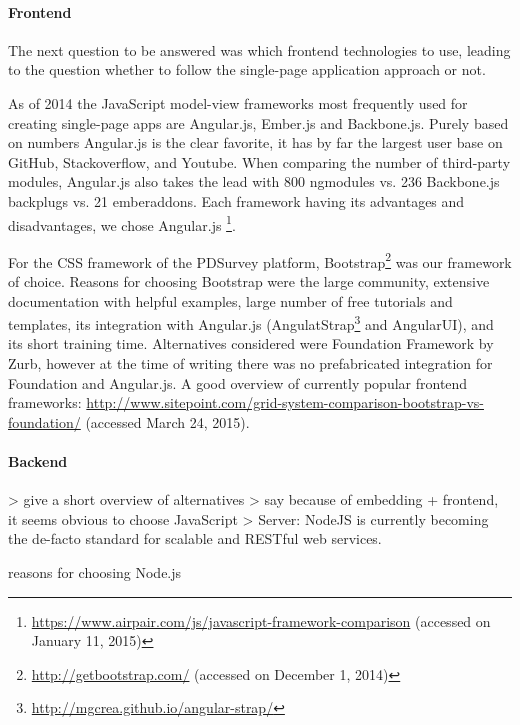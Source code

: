 	\paragraph{Frontend}

		The next question to be answered was which frontend technologies to use, leading to the question whether to follow the single-page application approach or not.

		As of 2014 the JavaScript model-view frameworks most frequently used for creating single-page apps are Angular.js, Ember.js and Backbone.js. Purely based on numbers Angular.js is the clear favorite, it has by far the largest user base on GitHub, Stackoverflow, and Youtube. When comparing the number of third-party modules, Angular.js also takes the lead with 800 ngmodules vs. 236 Backbone.js backplugs vs. 21 emberaddons. Each framework having its advantages and disadvantages, we chose Angular.js
		\footnote{\url{https://www.airpair.com/js/javascript-framework-comparison} (accessed on January 11, 2015)}.

		For the CSS framework of the PDSurvey platform, Bootstrap\footnote{\url{http://getbootstrap.com/} (accessed on December 1, 2014)} was our framework of choice. Reasons for choosing Bootstrap were the large community, extensive documentation with helpful examples, large number of free tutorials and templates, its integration with Angular.js (AngulatStrap\footnote{\url{http://mgcrea.github.io/angular-strap/}} and AngularUI), and its short training time.
		Alternatives considered were Foundation Framework by Zurb, however at the time of writing there was no prefabricated integration for Foundation and Angular.js.
		A good overview of currently popular frontend frameworks: \url{http://www.sitepoint.com/grid-system-comparison-bootstrap-vs-foundation/} (accessed March 24, 2015).


	


	\paragraph{Backend}

		> give a short overview of alternatives
		> say because of embedding + frontend, it seems obvious to choose JavaScript
		> Server: NodeJS is currently becoming the de-facto standard for scalable and RESTful web services.

		reasons for choosing Node.js

